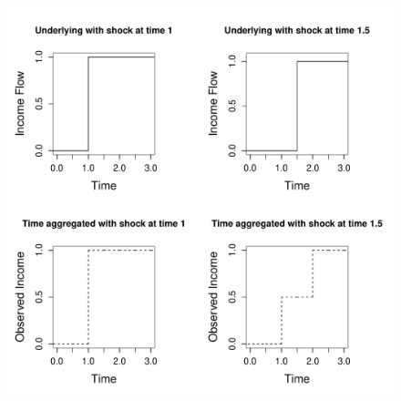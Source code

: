 \begin{figure}
	\label{fig:TimeAggExample}
	\includegraphics[width=1\textwidth]{TimeAggExample.pdf}
\end{figure}
